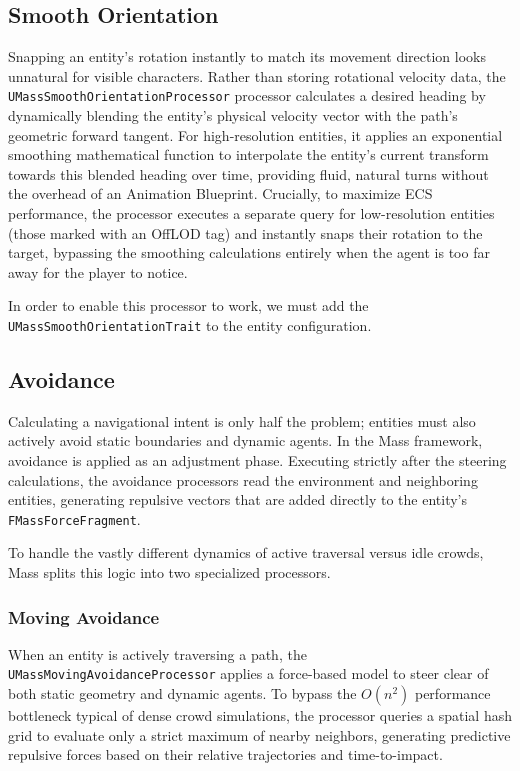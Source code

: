 \subsection{Smooth Orientation}

Snapping an entity's rotation instantly to match its movement direction looks unnatural for visible characters. Rather than storing rotational velocity data, the \texttt{UMassSmoothOrientationProcessor} processor calculates a desired heading by dynamically blending the entity's physical velocity vector with the path's geometric forward tangent. For high-resolution entities, it applies an exponential smoothing mathematical function to interpolate the entity's current transform towards this blended heading over time, providing fluid, natural turns without the overhead of an Animation Blueprint. Crucially, to maximize ECS performance, the processor executes a separate query for low-resolution entities (those marked with an OffLOD tag) and instantly snaps their rotation to the target, bypassing the smoothing calculations entirely when the agent is too far away for the player to notice.

In order to enable this processor to work, we must add the \newline\texttt{UMassSmoothOrientationTrait} to the entity configuration. 

\subsection{Avoidance}

Calculating a navigational intent is only half the problem; entities must also actively avoid static boundaries and dynamic agents. In the Mass framework, avoidance is applied as an adjustment phase. Executing strictly after the steering calculations, the avoidance processors read the environment and neighboring entities, generating repulsive vectors that are added directly to the entity's \texttt{FMassForceFragment}.

To handle the vastly different dynamics of active traversal versus idle crowds, Mass splits this logic into two specialized processors.

\subsubsection{Moving Avoidance}

When an entity is actively traversing a path, the \texttt{UMassMovingAvoidanceProcessor} applies a force-based model to steer clear of both static geometry and dynamic agents. To bypass the $O(n^2)$ performance bottleneck typical of dense crowd simulations, the processor queries a spatial hash grid to evaluate only a strict maximum of nearby neighbors, generating predictive repulsive forces based on their relative trajectories and time-to-impact.

